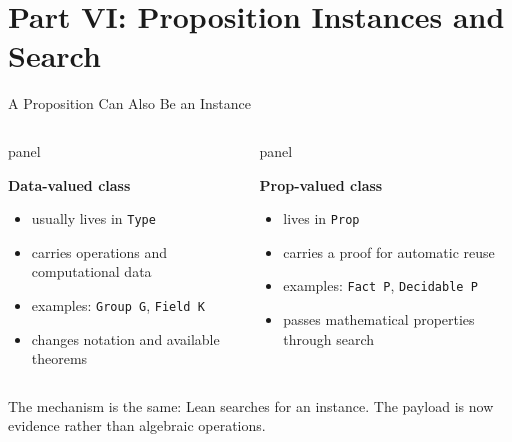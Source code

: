 \documentclass[aspectratio=169,10pt]{beamer}
\newcommand{\term}[1]{\textcolor{DOneBlue}{\textbf{#1}}}
\newenvironment{dpanel}{%
  \begin{beamercolorbox}[wd=\dimexpr\linewidth-9pt\relax,leftskip=0.15cm,rightskip=0.15cm plus1fil,rounded=true]{panel}%
  \setlength{\linewidth}{\hsize}%
  \vspace{0.10cm}%
}{\vspace{0.10cm}\end{beamercolorbox}}
\begin{document}
\section{Part VI: Proposition Instances and Search}

\begin{frame}{A Proposition Can Also Be an Instance}
\begin{columns}[T,onlytextwidth]
\begin{dpanel}
\term{Data-valued class}
\begin{itemize}
  \item usually lives in \texttt{Type}
  \item carries operations and computational data
  \item examples: \texttt{Group G}, \texttt{Field K}
  \item changes notation and available theorems
\end{itemize}
\end{dpanel}
\begin{dpanel}
\term{Prop-valued class}
\begin{itemize}
  \item lives in \texttt{Prop}
  \item carries a proof for automatic reuse
  \item examples: \texttt{Fact P}, \texttt{Decidable P}
  \item passes mathematical properties through search
\end{itemize}
\end{dpanel}
\end{columns}
\vspace{0.38cm}
The mechanism is the same: Lean searches for an instance. The payload is now evidence rather than algebraic operations.
\end{frame}
\end{document}
